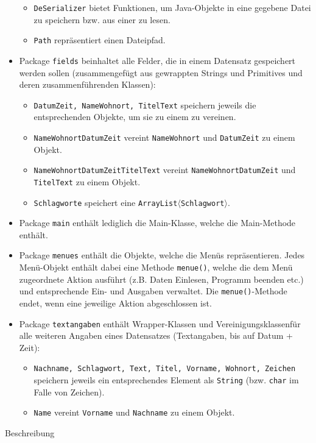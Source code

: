 \documentclass[oneside,12pt]{scrartcl}
\newcommand{\code}[1]{\textcolor{Firebrick4}{\bcode{#1}}}
\newcommand{\class}[1]{\textcolor{Green4}{\bcode{#1}}}
\newcommand{\package}[1]{Package \textcolor{Blue4}{\bcode{#1}}}
\newcommand{\method}[1]{\textcolor{Orange3}{\bcode{#1()}}}
\newcommand{\bcode}[1]{\texttt{#1}}
\begin{document}
\begin{itemize}
\begin{itemize}
\item \class{DeSerializer} bietet Funktionen, um Java-Objekte in eine gegebene Datei zu speichern bzw. aus einer zu lesen.
\item \class{Path} repräsentiert einen Dateipfad.
\end{itemize}
\item \package{fields} beinhaltet alle Felder, die in einem Datensatz gespeichert werden sollen (zusammengefügt aus gewrappten Strings und Primitives und deren zusammenführenden Klassen):
\begin{itemize}
\item \class{DatumZeit, NameWohnort, TitelText} speichern jeweils die entsprechenden Objekte, um sie zu einem zu vereinen.
\item \class{NameWohnortDatumZeit} vereint \class{NameWohnort} und \class{DatumZeit} zu einem Objekt.
\item \class{NameWohnortDatumZeitTitelText} vereint \class{NameWohnortDatumZeit} und \class{TitelText} zu einem Objekt.
\item \class{Schlagworte} speichert eine \code{ArrayList}$\langle$\class{Schlagwort}$\rangle$.
\end{itemize}
\item \package{main} enthält lediglich die Main-Klasse, welche die Main-Methode enthält.
\item \package{menues} enthält die Objekte, welche die Menüs repräsentieren. Jedes Menü-Objekt enthält dabei eine Methode \method{menue}, welche die dem Menü zugeordnete Aktion ausführt (z.B. Daten Einlesen, Programm beenden etc.) und entsprechende Ein- und Ausgaben verwaltet. Die \method{menue}-Methode endet, wenn eine jeweilige Aktion abgeschlossen ist.
\item \package{textangaben} enthält Wrapper-Klassen und \glqq Vereinigungsklassen\grqq für alle weiteren Angaben eines Datensatzes (Textangaben, bis auf Datum + Zeit):
\begin{itemize}
\item \class {Nachname, Schlagwort, Text, Titel, Vorname, Wohnort, Zeichen} speichern jeweils ein entsprechendes Element als \code{String} (bzw. \code{char} im Falle von Zeichen).
\item \class {Name} vereint \class{Vorname} und \class{Nachname} zu einem Objekt.
\end{itemize}
\end{itemize}Beschreibung
\end{document}
